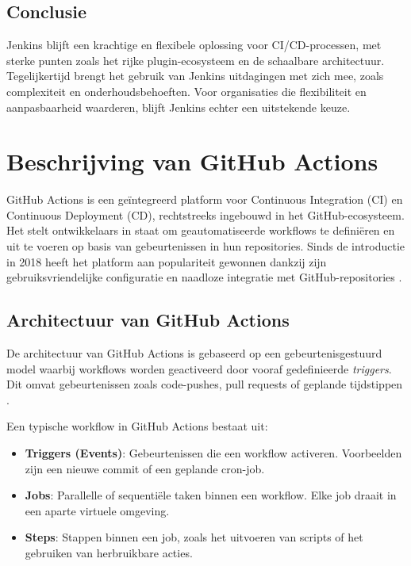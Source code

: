 \subsection{Conclusie}

Jenkins blijft een krachtige en flexibele oplossing voor CI/CD-processen, met sterke punten zoals het rijke plugin-ecosysteem en de schaalbare architectuur. Tegelijkertijd brengt het gebruik van Jenkins uitdagingen met zich mee, zoals complexiteit en onderhoudsbehoeften. Voor organisaties die flexibiliteit en aanpasbaarheid waarderen, blijft Jenkins echter een uitstekende keuze.


\section{Beschrijving van GitHub Actions}

GitHub Actions is een geïntegreerd platform voor Continuous Integration (CI) en Continuous Deployment (CD), rechtstreeks ingebouwd in het GitHub-ecosysteem. Het stelt ontwikkelaars in staat om geautomatiseerde workflows te definiëren en uit te voeren op basis van gebeurtenissen in hun repositories. Sinds de introductie in 2018 heeft het platform aan populariteit gewonnen dankzij zijn gebruiksvriendelijke configuratie en naadloze integratie met GitHub-repositories \autocite{githubdocs2023actions}.

\subsection{Architectuur van GitHub Actions}

De architectuur van GitHub Actions is gebaseerd op een gebeurtenisgestuurd model waarbij workflows worden geactiveerd door vooraf gedefinieerde \textit{triggers}. Dit omvat gebeurtenissen zoals code-pushes, pull requests of geplande tijdstippen \autocite{githubdocs2023actions}.

Een typische workflow in GitHub Actions bestaat uit:
\begin{itemize}
    \item \textbf{Triggers (Events)}: Gebeurtenissen die een workflow activeren. Voorbeelden zijn een nieuwe commit of een geplande cron-job.
    \item \textbf{Jobs}: Parallelle of sequentiële taken binnen een workflow. Elke job draait in een aparte virtuele omgeving.
    \item \textbf{Steps}: Stappen binnen een job, zoals het uitvoeren van scripts of het gebruiken van herbruikbare acties.
\end{itemize}


